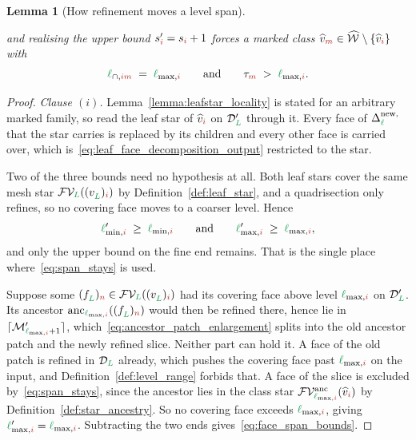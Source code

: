 \documentclass[a4paper, 12pt]{article}
\makeatletter
\newcommand{\lminIdx}[1]{\l_{\min,#1}}
\newcommand{\lmaxIdx}[1]{\l_{\max,#1}}
\newcommand{\levelSpan}[1]{s_{#1}}
\newcommand{\lmeetIdx}[2]{\l_{\cap,#1#2}}
\newcommand{\targetlevel}{\tau}                                 %
\newcommand{\green}{\color{ForestGreen}}
\newcommand{\brickred}{\color{BrickRed}}
\newcommand{\V}{\mathcal{V}}
\newcommand{\F}{\mathcal{F}}
\DeclareRobustCommand{\simplexsubsetNew}[2][]{\Delta^{\mathrm{new}\ifx\@empty#1\@empty\else,#1\fi}_{#2}}
\newcommand{\vertex}[2]{\freeQ{v}{}{#1}{#2}}
\newcommand{\vertexClass}[1]{\widehat{v}_{#1}}
\DeclareRobustCommand{\markedVertexClasses}[1][]{\widehat{\mathcal{W}}\ifx\@empty#1\@empty\else^{#1}\fi}
\newcommand{\face}[2]{\freeQ{f}{}{#1}{#2}}
\newcommand{\FVl}[1]{\F\V_{#1}}
\newcommand{\coarseIdxone}{{\brickred i}}
\newcommand{\coarseIdxtwo}{{\brickred m}}
\newcommand{\fineIdxtwo}{{\brickred n}}
\renewcommand{\l}{{\green\ell}}
\renewcommand{\L}{{\green L}}
\newcommand{\freeQ}[4]{ ( {#1}^{#2}_{#3} )_{#4}}
\newcommand{\M}{\mathcal{M}}
\newtheorem{lemma}[theorem]{Lemma}
\theoremstyle{definition}
\theoremstyle{plain}
\numberwithin{equation}{section}
\newcommand{\ancestorPatch}[1]{\lceil #1 \rceil}
\DeclareRobustCommand{\domseq}[1][]{\mathcal{D}\ifx\@empty#1\@empty\else_{#1}\fi}
\newcommand{\anc}[1]{\mathrm{anc}_{#1}}                     %
\newcommand{\FVanc}[1]{\F\V^{\mathrm{anc}}_{#1}}            %
\makeatother
\begin{document}
\begin{lemma}[How refinement moves a level span]
\begin{enumerate}[topsep=3pt, itemsep=-2pt]
\begin{equation}
        \end{equation}
        and realising the upper bound $\levelSpan{\coarseIdxone}' = \levelSpan{\coarseIdxone} + 1$ forces a marked class $\vertexClass{\coarseIdxtwo} \in \markedVertexClasses \setminus \{ \vertexClass{\coarseIdxone} \}$ with
        \begin{equation}
            \label{eq:span_opens}
            \lmeetIdx{\coarseIdxone}{\coarseIdxtwo} \; = \; \lmaxIdx{\coarseIdxone}
            \qquad \text{and} \qquad
            \targetlevel_\coarseIdxtwo \; > \; \lmaxIdx{\coarseIdxone}.
        \end{equation}
    \end{enumerate}
\end{lemma}
\begin{proof}
    \emph{Clause $(i)$.} Lemma~\ref{lemma:leafstar_locality} is stated for an arbitrary marked family, so read the leaf star of $\vertexClass{\coarseIdxone}$ on $\domseq[\L]'$ through it. Every face of $\simplexsubsetNew{\l}$ that the star carries is replaced by its children and every other face is carried over, which is~\eqref{eq:leaf_face_decomposition_output} restricted to the star.

    Two of the three bounds need no hypothesis at all. Both leaf stars cover the same mesh star $\FVl{\L}(\vertex{\L}{\coarseIdxone})$ by Definition~\ref{def:leaf_star}, and a quadrisection only refines, so no covering face moves to a coarser level. Hence
    \begin{equation*}
        \lminIdx{\coarseIdxone}' \; \geq \; \lminIdx{\coarseIdxone}
        \qquad \text{and} \qquad
        \lmaxIdx{\coarseIdxone}' \; \geq \; \lmaxIdx{\coarseIdxone} ,
    \end{equation*}
    and only the upper bound on the fine end remains. That is the single place where~\eqref{eq:span_stays} is used.

    Suppose some $\face{\L}{\fineIdxtwo} \in \FVl{\L}(\vertex{\L}{\coarseIdxone})$ had its covering face above level $\lmaxIdx{\coarseIdxone}$ on $\domseq[\L]'$. Its ancestor $\anc{\lmaxIdx{\coarseIdxone}}(\face{\L}{\fineIdxtwo})$ would then be refined there, hence lie in $\ancestorPatch{\M'_{\lmaxIdx{\coarseIdxone}+1}}$, which~\eqref{eq:ancestor_patch_enlargement} splits into the old ancestor patch and the newly refined slice. Neither part can hold it. A face of the old patch is refined in $\domseq[\L]$ already, which pushes the covering face past $\lmaxIdx{\coarseIdxone}$ on the input, and Definition~\ref{def:level_range} forbids that. A face of the slice is excluded by~\eqref{eq:span_stays}, since the ancestor lies in the class star $\FVanc{\lmaxIdx{\coarseIdxone}}(\vertexClass{\coarseIdxone})$ by Definition~\ref{def:star_ancestry}. So no covering face exceeds $\lmaxIdx{\coarseIdxone}$, giving $\lmaxIdx{\coarseIdxone}' = \lmaxIdx{\coarseIdxone}$. Subtracting the two ends gives~\eqref{eq:face_span_bounds}.


\end{proof}
\end{document}
